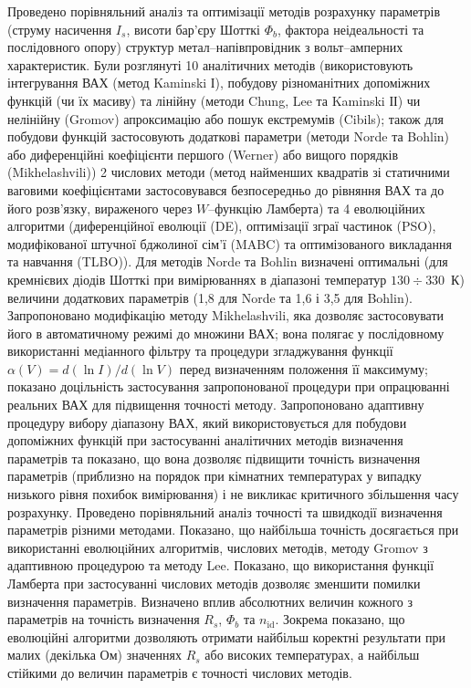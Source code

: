 Проведено порівняльний аналіз та оптимізації методів розрахунку параметрів (струму насичення  $I_s$, висоти бар'єру Шотткі  $\Phi_b$, фактора неідеальності та послідовного опору) структур метал--напівпровідник з вольт--амперних характеристик.
Були розглянуті 10 аналітичних методів (використовують інтегрування ВАХ (метод Kaminski І), побудову різноманітних допоміжних функцій (чи їх масиву) та лінійну (методи Chung, Lee та Kaminski ІІ) чи нелінійну (Gromov) апроксимацію або пошук екстремумів (Cibils);
також для побудови функцій застосовують додаткові параметри (методи Norde та Bohlin) або диференційні коефіцієнти першого (Werner) або вищого порядків (Mikhelashvili))
2 числових методи (метод найменших квадратів зі статичними ваговими коефіцієнтами застосовувався безпосередньо до рівняння ВАХ та до його розв'язку, вираженого через $W$--функцію Ламберта) та
4 еволюційних алгоритми (диференційної еволюції (DE),
оптимізації зграї частинок (PSO),
модифікованої штучної бджолиної сім'ї (MABC) та
оптимізованого викладання та навчання (TLBO)).
Для методів Norde та Bohlin визначені  оптимальні (для кремнієвих діодів Шотткі при вимірюваннях в діапазоні температур $130\div330$~К) величини додаткових параметрів (1,8 для Norde та 1,6 і 3,5 для Bohlin).
Запропоновано модифікацію методу Mikhelashvili, яка дозволяє застосовувати його в автоматичному режимі до множини ВАХ;
вона полягає у послідовному використанні медіанного фільтру та процедури згладжування функції $\alpha(V)=d(\ln I)/d(\ln V)$ перед визначенням положення її максимуму;
показано доцільність застосування запропонованої процедури при опрацюванні реальних ВАХ для підвищення точності методу.
Запропоновано адаптивну процедуру вибору діапазону ВАХ, який використовується для побудови допоміжних функцій при застосуванні аналітичних методів визначення параметрів та показано, що вона дозволяє підвищити точність визначення параметрів (приблизно на порядок при кімнатних температурах у випадку низького рівня похибок вимірювання) і не викликає критичного збільшення часу розрахунку.
Проведено порівняльний аналіз точності  та швидкодії  визначення параметрів різними методами.
Показано, що найбільша точність досягається при використанні еволюцiйних алгоритмів, числових методів, методу Gromov з адаптивною процедурою та методу Lee.
Показано, що використання функції Ламберта при застосуванні числових методів дозволяє зменшити помилки визначення параметрів.
Визначено вплив абсолютних величин кожного з параметрів на точність визначення $R_s$, $\Phi_b$ та $n_\mathrm{id}$.
Зокрема показано, що еволюційні алгоритми дозволяють отримати найбільш коректні результати при малих (декілька Ом) значеннях $R_s$ або високих температурах, а найбільш стійкими до величин параметрів є точності числових методів.

